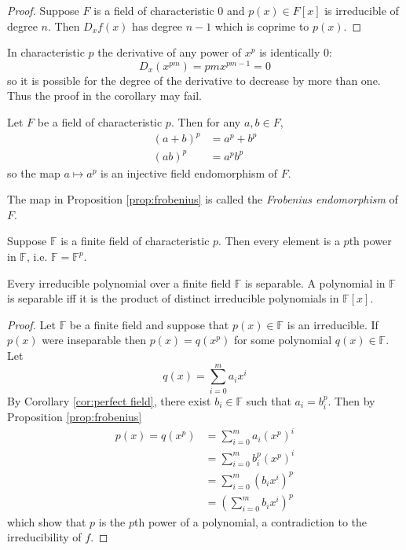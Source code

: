 \documentclass[a4paper]{article}
\begin{document}
\begin{proof}
  Suppose $F$ is a field of characteristic $0$ and $p(x)\in F[x]$ is irreducible of degree $n$. Then $D_xf(x)$ has degree $n-1$ which is coprime to $p(x)$.
\end{proof}

\begin{remark}
  In characteristic $p$ the derivative of any power of $x^p$ is identically $0$:
  \[ D_x(x^{pm}) = pmx^{pm-1} = 0 \]
  so it is possible for the degree of the derivative to decrease by more than one. Thus the proof in the corollary may fail.
\end{remark}

\begin{proposition}\label{prop:frobenius}
  Let $F$ be a field of characteristic $p$. Then for any $a,b\in F$,
  \begin{align*}
    (a+b)^p &= a^p+b^p\\
    (ab)^p &= a^p b^p
  \end{align*}
  so the map $a \mapsto a^p$ is an injective field endomorphism of $F$.
\end{proposition}

\begin{definition}
  The map in Proposition \ref{prop:frobenius} is called the \emph{Frobenius endomorphism} of $F$.
\end{definition}

\begin{corollary}\label{cor:perfect field}
  Suppose $\mathbb{F}$ is a finite field of characteristic $p$. Then every element is a $p$th power in $\mathbb F$, i.e. $\mathbb F = \mathbb F^p$.
\end{corollary}

\begin{proposition}
  Every irreducible polynomial over a finite field $\mathbb F$ is separable. A polynomial in $\mathbb F$ is separable iff it is the product of distinct irreducible polynomials in $\mathbb F[x]$.
\end{proposition}

\begin{proof}
  Let $\mathbb F$ be a finite field and suppose that $p(x)\in\mathbb F$ is an irreducible. If $p(x)$ were inseparable then $p(x)=q(x^p)$ for some polynomial $q(x)\in \mathbb F$. Let
  \[ q(x) = \sum_{i=0}^m a_i x^i \]
  By Corollary \ref{cor:perfect field}, there exist $b_i\in \mathbb F$ such that $a_i= b_i^p$. Then by Proposition \ref{prop:frobenius}
  \begin{align*}
    p(x)= q(x^p) &= \sum_{i=0}^m a_i (x^p)^i\\
                 &= \sum_{i=0}^m b_i^p (x^p)^i\\
                 &= \sum_{i=0}^m (b_i x^i)^p\\
                 &= (\sum_{i=0}^m b_i x^i)^p
  \end{align*}
  which show that $p$ is the $p$th power of a polynomial, a contradiction to the irreducibility of $f$.
\end{proof}
\end{document}
